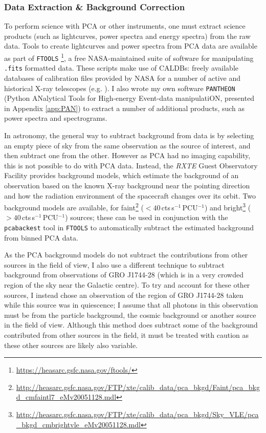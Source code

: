 \subsubsection{Data Extraction \& Background Correction}

\par To perform science with PCA or other instruments, one must extract science products (such as lightcurves, power spectra and energy spectra) from the raw data.  Tools to create lightcurves and power spectra from PCA data are available as part of \texttt{FTOOLS} \footnote{\url{https://heasarc.gsfc.nasa.gov/ftools/}}, a free NASA-maintained suite of software for manipulating \texttt{.fits} formatted data.  These scripts make use of CALDBs: freely available databases of calibration files provided by NASA for a number of active and historical X-ray telescopes (e.g. \citealp{Graessle_ChaCALDB}).  I also wrote my own software \texttt{PANTHEON} (Python ANalytical Tools for High-energy Event-data manipulatiON, presented in Appendix \ref{app:PAN}) to extract a number of additional products, such as power spectra and spectrograms.
\par In astronomy, the general way to subtract background from data is by selecting an empty piece of sky from the same observation as the source of interest, and then subtract one from the other.  However as PCA had no imaging capability, this is not possible to do with PCA data.  Instead, the \textit{RXTE} Guest Observatory Facility provides background models, which estimate the background of an observation based on the known X-ray background near the pointing direction and how the radiation environment of the spacecraft changes over its orbit.  Two background models are available, for faint\footnote{\url{http://heasarc.gsfc.nasa.gov/FTP/xte/calib_data/pca_bkgd/Faint/pca_bkgd_cmfaintl7_eMv20051128.mdl}} ($<40$\,cts\,s$^{-1}$\,PCU$^{-1}$) and bright\footnote{\url{http://heasarc.gsfc.nasa.gov/FTP/xte/calib_data/pca_bkgd/Sky_VLE/pca_bkgd_cmbrightvle_eMv20051128.mdl}} ($>40$\,cts\,s$^{-1}$\,PCU$^{-1}$) sources; these can be used in conjunction with the \texttt{pcabackest} tool in \texttt{FTOOLS} to automatically subtract the estimated background from binned PCA data.
\par As the PCA background models do not subtract the contributions from other sources in the field of view, I also use a different technique to subtract background from observations of GRO J1744-28 (which is in a very crowded region of the sky near the Galactic centre).  To try and account for these other sources, I instead chose an observation of the region of GRO J1744-28 taken while this source was in quiescence; I assume that all photons in this observation must be from the particle background, the cosmic background or another source in the field of view.  Although this method does subtract some of the background contributed from other sources in the field, it must be treated with caution as these other sources are likely also variable.
